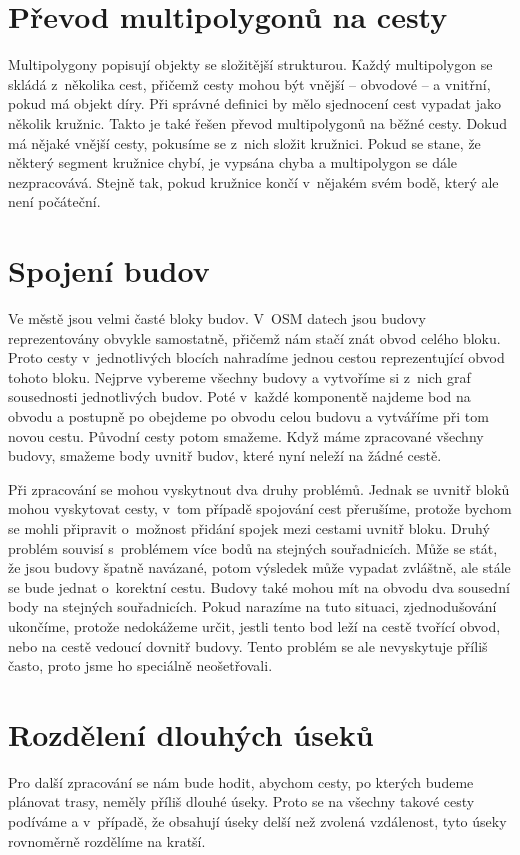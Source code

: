 \section{Převod multipolygonů na cesty}
Multipolygony popisují objekty se složitější strukturou. Každý multipolygon se
skládá z~několika cest, přičemž cesty mohou být vnější -- obvodové -- a
vnitřní, pokud má objekt díry. Při správné definici by mělo sjednocení cest
vypadat jako několik kružnic. Takto je také řešen převod multipolygonů na běžné
cesty. Dokud má nějaké vnější cesty, pokusíme se z~nich složit kružnici.  Pokud
se stane, že některý segment kružnice chybí, je vypsána chyba a multipolygon se
dále nezpracovává. Stejně tak, pokud kružnice končí v~nějakém svém bodě, který
ale není počáteční. 

\section{Spojení budov}
Ve městě jsou velmi časté bloky budov. V~OSM datech jsou budovy reprezentovány
obvykle samostatně, přičemž nám stačí znát obvod celého bloku. Proto cesty
v~jednotlivých blocích nahradíme jednou cestou reprezentující obvod tohoto bloku.
Nejprve vybereme všechny budovy a vytvoříme si z~nich graf sousednosti
jednotlivých budov. Poté v~každé komponentě najdeme bod na obvodu a postupně
po obejdeme po obvodu celou budovu a vytváříme při tom novou cestu. Původní
cesty potom smažeme. Když máme zpracované všechny budovy, smažeme body uvnitř
budov, které nyní neleží na žádné cestě.

Při zpracování se mohou vyskytnout dva druhy problémů. Jednak se uvnitř bloků
mohou vyskytovat cesty, v~tom případě spojování cest přerušíme, protože bychom
se mohli připravit o~možnost přidání spojek mezi cestami uvnitř bloku. Druhý
problém souvisí s~problémem více bodů na stejných souřadnicích. Může se stát, že
jsou budovy špatně navázané, potom výsledek může vypadat zvláštně, ale stále se
bude jednat o~korektní cestu. Budovy také mohou mít na obvodu dva sousední body
na stejných souřadnicích. Pokud narazíme na tuto situaci, zjednodušování
ukončíme, protože nedokážeme určit, jestli tento bod leží na cestě tvořící
obvod, nebo na cestě vedoucí dovnitř budovy. Tento problém se ale nevyskytuje
příliš často, proto jsme ho speciálně neošetřovali.

\section{Rozdělení dlouhých úseků}
Pro další zpracování se nám bude hodit, abychom cesty, po kterých budeme
plánovat trasy, neměly příliš dlouhé úseky. Proto se na všechny takové cesty
podíváme a v~případě, že obsahují úseky delší než zvolená vzdálenost, tyto úseky
rovnoměrně rozdělíme na kratší. 

